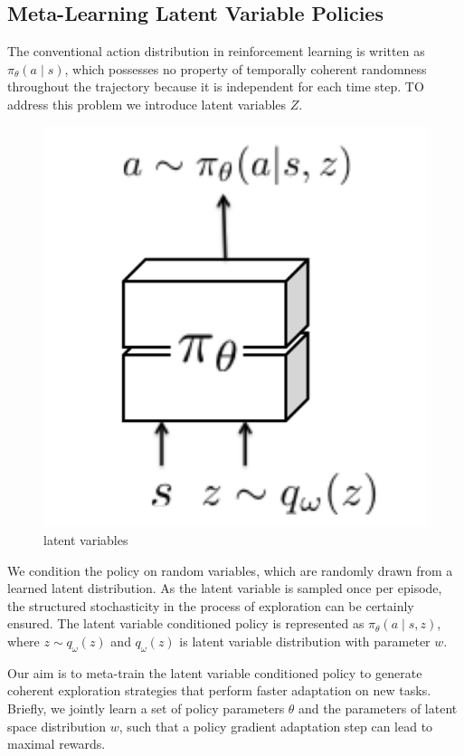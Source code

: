 \subsection{ Meta-Learning Latent Variable Policies}
The conventional action distribution in reinforcement learning is written as $\pi_{\theta}(a\mid s)$, which possesses no property of temporally coherent randomness throughout the trajectory because it is independent for each time step. TO address this problem we introduce latent variables $Z$. 
\begin{figure}[H]
	\includegraphics[scale=0.6]{MAESN_01.PNG}
	\centering
	\caption{latent variables}
	\label{MAESN}
\end{figure}

 We condition the policy on random variables, which are randomly drawn from a learned latent distribution. As the latent variable is sampled once per episode, the structured stochasticity in the process of exploration can be certainly ensured. The latent variable conditioned policy is represented as $\pi_{\theta}(a \mid s, z)$, where $z \sim q_{\omega}(z)$ and $q_{\omega}(z)$ is latent variable distribution with parameter $w$. 

Our aim is to meta-train the latent variable conditioned policy to generate coherent exploration strategies that perform faster adaptation on new tasks. Briefly, we jointly learn a set of policy parameters $\theta$ and the parameters of latent space distribution $w$, such that a policy gradient adaptation step can lead to maximal rewards.

